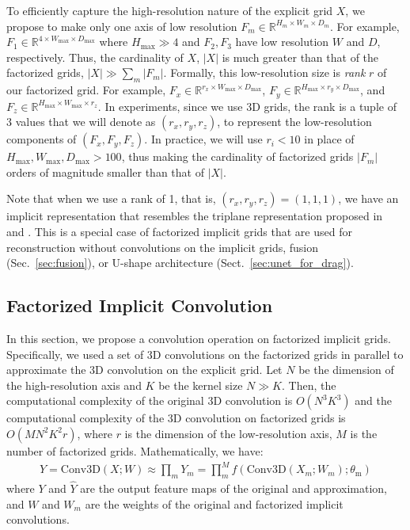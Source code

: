 To efficiently capture the high-resolution nature of the explicit grid $X$, we propose to make only one axis of low resolution $F_m \in \mathbb{R}^{H_m \times W_m \times D_m}$.
For example, $F_1 \in \mathbb{R}^{4 \times W_{\max} \times D_{\max}}$ where $H_{\max} \gg 4$ and $F_2, F_3$ have low resolution $W$ and $D$, respectively. Thus, the cardinality of $X$, $|X|$ is much greater than that of the factorized grids, $|X| \gg \sum_m|F_m|$. 
Formally, this low-resolution size is \emph{rank} $r$ of our factorized grid.
For example, $F_x \in \mathbb{R}^{r_x \times W_{\max} \times D_{\max}}$, $F_y \in \mathbb{R}^{H_{\max} \times r_y \times D_{\max}}$, and $F_z \in \mathbb{R}^{H_{\max} \times W_{\max} \times r_z}$. In experiments, since we use 3D grids, the rank is a tuple of 3 values that we will denote as $(r_x, r_y, r_z)$, to represent the low-resolution components of $(F_x, F_y, F_z)$. In practice, we will use $r_i < 10$ in place of $H_{\max}, W_{\max}, D_{\max} > 100$, thus making the cardinality of factorized grids $|F_m|$ orders of magnitude smaller than that of $|X|$.

Note that when we use a rank of 1, that is, $(r_x, r_y, r_z) = (1, 1, 1)$, we have
an implicit representation that resembles the triplane representation proposed in~\citet{chan2022efficient} and \citet{Chen2022ECCV}. This is a special case of factorized implicit grids that are used for reconstruction without convolutions on the implicit grids, fusion (Sec.~\ref{sec:fusion}), or U-shape architecture (Sect.~\ref{sec:unet_for_drag}).

\subsection{Factorized Implicit Convolution}
\label{sec:figconv}


In this section, we propose a convolution operation on factorized implicit grids. Specifically, we used a set of 3D convolutions on the factorized grids in parallel to approximate the 3D convolution on the explicit grid.
Let $N$ be the dimension of the high-resolution axis and $K$ be the kernel size $N \gg K$. Then, the computational complexity of the original 3D convolution is $O(N^3K^3)$ and the computational complexity of the 3D convolution on factorized grids is $O(M N^2K^2r)$, where $r$ is the dimension of the low-resolution axis, $M$ is the number of factorized grids.
Mathematically, we have:
\begin{align}
    Y = \text{Conv3D}(X; W) \approx \prod_m Y_m = \prod_m^M f(\text{Conv3D}(X_m; W_m); \theta_\text{m})
\end{align}
where $Y$ and $\hat{Y}$ are the output feature maps of the original and approximation, and $W$ and $W_m$ are the weights of the original and factorized implicit convolutions.


